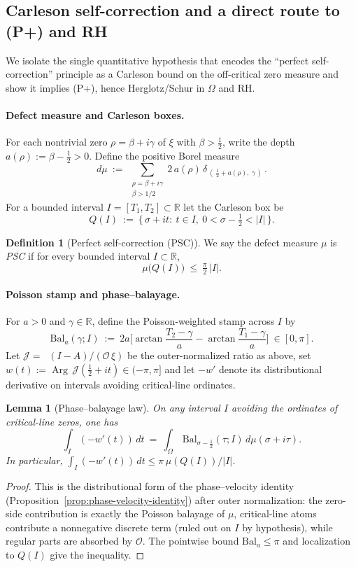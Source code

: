 \documentclass[11pt]{article}
\newtheorem{lemma}[theorem]{Lemma}
\theoremstyle{definition}
\newtheorem{definition}[theorem]{Definition}
\theoremstyle{remark}
\newcommand{\R}{\mathbb{R}}
\DeclareMathOperator{\dettwo}{det_2}
\DeclareMathOperator{\Arg}{Arg}
\begin{document}
\subsection{Carleson self-correction and a direct route to (P+) and RH}\label{subsec:PSC}
We isolate the single quantitative hypothesis that encodes the ``perfect self-correction'' principle as a Carleson bound on the off-critical zero measure and show it implies (P+), hence Herglotz/Schur in \(\Omega\) and RH.

\paragraph{Defect measure and Carleson boxes.}
For each nontrivial zero \(\rho=\beta+i\gamma\) of \(\xi\) with \(\beta>\tfrac12\), write the depth \(a(\rho):=\beta-\tfrac12>0\). Define the positive Borel measure
\[
 d\mu\ :=\ \sum_{\substack{\rho=\beta+i\gamma\\ \beta>1/2}} 2\,a(\rho)\,\delta_{\,(\,\tfrac12+a(\rho),\ \gamma\,)}\,.
\]
For a bounded interval \(I=[T_1,T_2]\subset\R\) let the Carleson box be
\[
 Q(I)\ :=\ \{\,\sigma+it:\ t\in I,\ 0<\sigma-\tfrac12<|I|\,\}.
\]
\begin{definition}[Perfect self-correction (PSC)]\label{def:PSC}
We say the defect measure \(\mu\) is \emph{PSC} if for every bounded interval \(I\subset\R\),
\[
 \mu\big(Q(I)\big)\ \le\ \tfrac{\pi}{2}\,|I|.
\]
\end{definition}
\paragraph{Poisson stamp and phase--balayage.}
For \(a>0\) and \(\gamma\in\R\), define the Poisson-weighted stamp across \(I\) by
\[
 \mathrm{Bal}_a(\gamma;I)\ :=\ 2a\Big[\arctan\!\frac{T_2-\gamma}{a}-\arctan\!\frac{T_1-\gamma}{a}\Big]\ \in [0,\pi].
\]
Let \(\mathcal J=\dettwo(I-A)/(\mathcal O\,\xi)\) be the outer-normalized ratio as above, set \(w(t):=\Arg\,\mathcal J(\tfrac12+it)\in(-\pi,\pi] \) and let \(-w'\) denote its distributional derivative on intervals avoiding critical-line ordinates.
\begin{lemma}[Phase--balayage law]\label{lem:balayage-law}
On any interval \(I\) avoiding the ordinates of critical-line zeros, one has
\[
 \int_I (-w'(t))\,dt\ =\ \int_{\Omega}\, \mathrm{Bal}_{\sigma-\frac12}(\tau;I)\, d\mu(\sigma+i\tau).
\]
In particular, \(\int_I (-w'(t))\,dt\le \pi\, \mu(Q(I))/|I|\).
\end{lemma}
\begin{proof}
This is the distributional form of the phase--velocity identity (Proposition~\ref{prop:phase-velocity-identity}) after outer normalization: the zero-side contribution is exactly the Poisson balayage of \(\mu\), critical-line atoms contribute a nonnegative discrete term (ruled out on \(I\) by hypothesis), while regular parts are absorbed by \(\mathcal O\). The pointwise bound \(\mathrm{Bal}_a\le\pi\) and localization to \(Q(I)\) give the inequality.
\end{proof}
\end{document}
